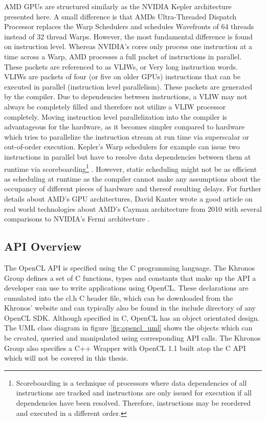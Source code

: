 AMD GPUs are structured similarly as the NVIDIA Kepler architecture presented here. A small difference is that AMDs Ultra-Threaded Dispatch Processor replaces the Warp Schedulers and schedules Wavefronts of 64 threads instead of 32 thread Warps. However, the most fundamental difference is found on instruction level. Whereas NVIDIA's cores only process one instruction at a time across a Warp, AMD processes a full packet of instructions in parallel. These packets are referenced to as VLIWs, or Very long instruction words. VLIWs are packets of four (or five on older GPUs) instructions that can be executed in parallel (instruction level parallelism). These packets are generated by the compiler. Due to dependencies between instructions, a VLIW may not always be completely filled and therefore not utilize a VLIW processor completely. Moving instruction level parallelization into the compiler is advantageous for the hardware, as it becomes simpler compared to hardware which tries to parallelize the instruction stream at run time via superscalar or out-of-order execution. Kepler's Warp schedulers for example can issue two instructions in parallel but have to resolve data dependencies between them at runtime via scoreboarding\footnote{Scoreboarding is a technique of processors where data dependencies of all instructions are tracked and instructions are only issued for execution if all dependencies have been resolved. Therefore, instructions may be reordered and executed in a different order.} \cite[p.4]{cayman_arch}. However, static scheduling might not be as efficient as scheduling at runtime as the compiler cannot make any assumptions about the occupancy of different pieces of hardware and thereof resulting delays. For further details about AMD's GPU architectures, David Kanter wrote a good article on real world technologies about AMD's Cayman architecture from 2010 with several comparisons to NVIDIA's Fermi architecture \cite{cayman_arch}.

\subsection{API Overview}

The OpenCL API is specified using the C programming language. The Khronos Group defines a set of C functions, types and constants that make up the API a developer can use to write applications using OpenCL. These declarations are cumulated into the cl.h C header file, which can be downloaded from the Khronos' website and can typically also be found in the include directory of any OpenCL SDK. Although specified in C, OpenCL has an object orientated design. The UML class diagram in figure \ref{fig:opencl_uml} shows the objects which can be created, queried and manipulated using corresponding API calls. The Khronos Group also specifies a C++ Wrapper with OpenCL 1.1 built atop the C API which will not be covered in this thesis.


